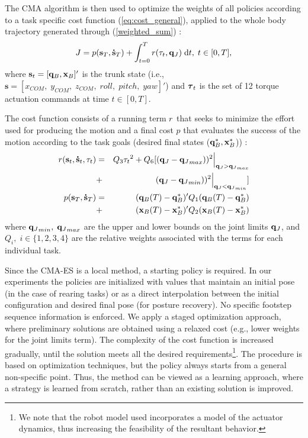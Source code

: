 \documentclass[usletter, 10pt, conference]{ieeeconf}      %
\begin{document}
The CMA algorithm is then used to optimize the weights of all 
policies according to a task specific cost function (\ref{eq:cost_general}), applied to the 
whole body trajectory generated through (\ref{weighted_sum}) : 
\begin{equation}
 \label{eq:cost_general}
  J = p (\mathbf{s}_T, \mathbf{\dot{s}}_T)+\int^{T}_{t=0}r(\mathbf{\tau}_t, \mathbf{q}_{J})\;\mathrm{d}t, \; t \in [0,T],
\end{equation}
\noindent
where $\mathbf{s}_t = [\mathbf{q}_{B}, \mathbf{x}_{B}]'$ is the trunk state (i.e., $\mathbf{s} 
= [x_{COM}, \; y_{COM}, \; z_{COM}, \; roll, \; pitch, \; yaw]'$)
and $\boldsymbol{\tau}_t$ is the set of 12 torque actuation commands at time $t \in 
[0,T]$.

The cost function consists of a running term $ r $ that seeks 
to minimize the effort used for producing the motion and a final 
cost $p$ that evaluates the success of the motion according to the task goals 
(desired final states ($\mathbf{q}^{*}_{B}, \mathbf{x}^{*}_{B}$)) :
\begin{eqnarray}
 \label{eq:final_cost}
  r( \mathbf{s}_t, \mathbf{\dot{s}}_t, \mathbf{\tau}_t)  & = & Q_{3}  {\mathbf{\tau}_t}^{2} 
    + Q_{6} [(\mathbf{q}_{J} - {\mathbf{q}_{J}}_{max}))^2 \Big|_{\mathbf{q}_{J}  > {\mathbf{q}_{J}}_{max}} \\ \nonumber
    & + & (\mathbf{q}_{J} - {\mathbf{q}_{J}}_{min}))^2 \Big|_{\mathbf{q}_{J}  < {\mathbf{q}_{J}}_{min}}] \\ \nonumber
  p (\mathbf{s}_T, \mathbf{\dot{s}}_T) & = & (\mathbf{q}_{B}(T) - \mathbf{q}^{*}_{B})' Q_{1} (\mathbf{q}_{B}(T) - \mathbf{q}^{*}_{B}) \\ 
  & + & (\mathbf{x}_{B}(T) - \mathbf{x}^{*}_{B})' Q_{2} (\mathbf{x}_{B}(T) - \mathbf{x}^{*}_{B})
\end{eqnarray}
\noindent
where ${\mathbf{q}_{J}}_{min},\; {\mathbf{q}_{J}}_{max}$ are the upper and lower bounds on the joint limits $\mathbf{q}_{J}$,
and $Q_{i}, \; i \in \{1,2,3,4\}$ are the relative weights associated with the terms for each individual task.


Since the CMA-ES is a local method, a starting policy is required.
In our experiments the policies are initialized with values that maintain an 
initial pose (in the case of rearing tasks) or as a direct interpolation 
between the initial configuration and desired final pose (for posture recovery).
No specific footstep sequence information is enforced. We apply 
a staged optimization approach, where preliminary solutions are obtained using 
a relaxed cost (e.g., lower weights for the joint limits term). The complexity of the cost 
function is increased gradually, until the solution meets all the desired 
requirements\footnote{We note that the robot model used incorporates a model of the
actuator dynamics, thus increasing the feasibility of the resultant behavior.}. The procedure
is based on optimization techniques, but the policy always starts from a general
non-specific point. Thus, the method can be viewed as a learning approach, where a
strategy is learned from scratch, rather than an existing solution is improved.
\end{document}

